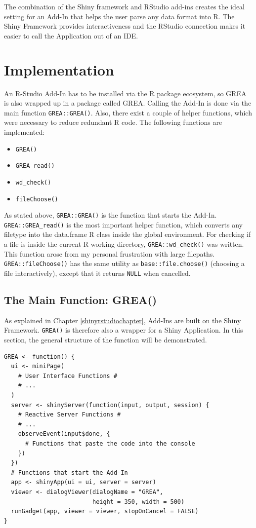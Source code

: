 \documentclass[12pt]{article} %
\newcommand{\li}{\lstinline}
\begin{document}
The combination of the Shiny framework and RStudio add-ins creates the ideal setting for an Add-In that helps the user parse any data format into R. The Shiny Framework provides interactiveness and the RStudio connection makes it easier to call the Application out of an IDE.

\section{Implementation}

An R-Studio Add-In has to be installed via the R package ecosystem, so GREA is also wrapped up in a package called GREA. Calling the Add-In is done via the main function \li{GREA::GREA()}. Also, there exist a couple of helper functions, which were necessary to reduce redundant R code.
The following functions are implemented:

\begin{itemize}
\item \li{GREA()}
\item \li{GREA_read()}
\item \li{wd_check()}
\item \li{fileChoose()}
\end{itemize}

As stated above, \li{GREA::GREA()} is the function that starts the Add-In. \li{GREA::GREA_read()} is the most important helper function, which converts any filetype into the data.frame R class inside the global environment. For checking if a file is inside the current R working directory, \li{GREA::wd_check()} was written. This function arose from my personal frustration with large filepaths. \li{GREA::fileChoose()} has the same utility as \li{base::file.choose()} (choosing a file interactively), except that it returns \li{NULL} when cancelled.

\subsection{The Main Function: \textrm{GREA()}}
As explained in Chapter \ref{shinyrstudiochapter}, Add-Ins are built on the Shiny Framework. \li{GREA()} is therefore also a wrapper for a Shiny Application. In this section, the general structure of the function will be demonstrated.

\begin{lstlisting}[caption = Structure of the \li{GREA()} function, label = greacode]
GREA <- function() {
  ui <- miniPage(
    # User Interface Functions #
    # ...
  )
  server <- shinyServer(function(input, output, session) {
    # Reactive Server Functions #
    # ...
    observeEvent(input$done, {
      # Functions that paste the code into the console
    })
  })
  # Functions that start the Add-In
  app <- shinyApp(ui = ui, server = server)
  viewer <- dialogViewer(dialogName = "GREA", 
                         height = 350, width = 500)
  runGadget(app, viewer = viewer, stopOnCancel = FALSE)
}
\end{lstlisting}
\end{document}
